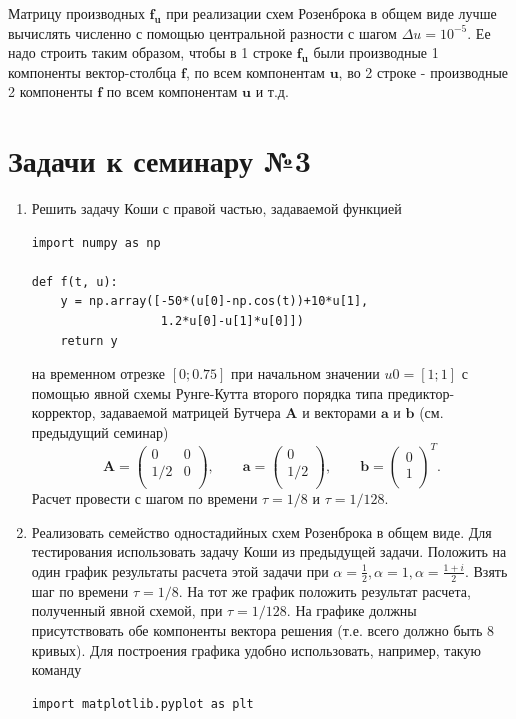 \documentclass{article}
\begin{document}
Матрицу производных $\mathbf{f_u}$ при реализации схем Розенброка в общем виде лучше вычислять численно с помощью центральной разности с шагом $\Delta u = 10^{-5}$. Ее надо строить таким образом, чтобы в 1 строке $\mathbf{f_u}$ были производные 1 компоненты вектор-столбца $\mathbf{f}$, по всем компонентам $\mathbf{u}$, во 2 строке - производные 2 компоненты $\mathbf{f}$ по всем компонентам $\mathbf{u}$ и т.д.

\newpage

\section*{Задачи к семинару №3}
\begin{enumerate}
\item Решить задачу Коши с правой частью, задаваемой функцией
\begin{verbatim}
import numpy as np

def f(t, u):
    y = np.array([-50*(u[0]-np.cos(t))+10*u[1], 
                  1.2*u[0]-u[1]*u[0]])
    return y
\end{verbatim}
на временном отрезке $[0; 0.75]$
при начальном значении $u0 = [1; 1]$ с помощью явной схемы Рунге-Кутта второго порядка типа предиктор-корректор, задаваемой матрицей Бутчера $\mathbf{A}$ и векторами $\mathbf{a}$ и $\mathbf{b}$ (см. предыдущий семинар)
\begin{equation} \nonumber
	\mathbf{A} = 
		\begin{pmatrix}
		0 & 0 \\
		1/2 & 0 \\
		\end{pmatrix},
	\qquad
	\mathbf{a} = 
		\begin{pmatrix}
		0 \\
		1/2 \\
		\end{pmatrix},
	\qquad
	\mathbf{b} = 
		\begin{pmatrix}
		0 \\
		1 \\
		\end{pmatrix}^T.
\end{equation}
Расчет провести с шагом по времени $\tau = 1/8$ и $\tau = 1/128$.
\item Реализовать семейство одностадийных схем Розенброка в общем виде. Для тестирования использовать задачу Коши из предыдущей задачи. Положить на один график результаты расчета этой задачи при $\alpha = \frac{1}{2}, \alpha = 1, \alpha = \frac{1+i}{2}$. Взять шаг по времени $\tau = 1/8$. На тот же график положить результат расчета, полученный явной схемой, при $\tau = 1/128$. На графике должны присутствовать обе компоненты вектора решения (т.е. всего должно быть 8 кривых). Для построения графика удобно использовать, например, такую команду
\begin{verbatim}
import matplotlib.pyplot as plt


\end{verbatim}
\end{enumerate}
\end{document}
